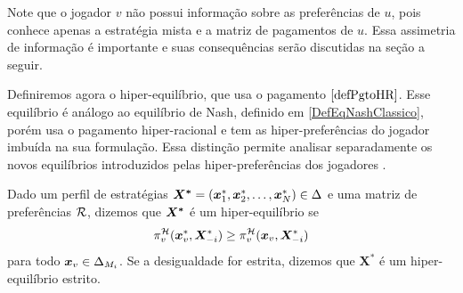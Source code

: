 Note que o jogador $v$ não possui informação sobre as preferências de $u$, pois conhece apenas a estratégia mista e a matriz de pagamentos de $u$. Essa assimetria de informação é importante e suas consequências serão discutidas na seção a seguir. 

Definiremos agora o hiper-equilíbrio, que usa o pagamento $\eqref{defPgtoHR}$. Esse equilíbrio é análogo ao equilíbrio de Nash, definido em \ref{DefEqNashClassico}, porém usa o pagamento hiper-racional e tem as hiper-preferências do jogador imbuída na sua formulação. Essa distinção permite analisar separadamente os novos equilíbrios introduzidos pelas hiper-preferências dos jogadores \cite{askari2019behavioral}.

\begin{definition}
    \label{defHiperEq}
    Dado um perfil de estratégias $\boldsymbol{X^*}=(\boldsymbol{x}^*_{1},\boldsymbol{x}^*_{2},\dots,\boldsymbol{x}^*_{N})\in\Delta$ e uma matriz de preferências $\mathcal{R}$, dizemos que $\boldsymbol{X^*}$ é um hiper-equilíbrio se
    \begin{equation*}
        \pi^{\mathcal{H}}_v(\boldsymbol{x}^*_v,\boldsymbol{X}^*_{-i})\geq \pi^{\mathcal{H}}_v(\boldsymbol{x}_v,\boldsymbol{X}^*_{-i})
    \end{equation*}
    para todo $\boldsymbol{x}_v\in\Delta_{M_i}$. Se a desigualdade for estrita, dizemos que $\boldsymbol{X^*}$ é um hiper-equilíbrio estrito.
\end{definition}


